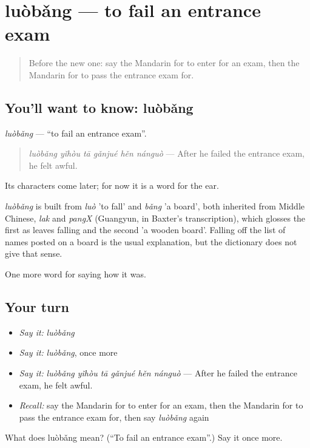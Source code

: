 \section[luòbǎng]{luòbǎng — to fail an entrance exam}

\label{lesson:ZH-C494-luobang}



\begin{quote}
Before the new one: say the Mandarin for to enter for an exam, then the Mandarin for to pass the entrance exam for.
\end{quote}

\subsection*{You'll want to know: luòbǎng}
\emph{luòbǎng} — \textquotedblleft{}to fail an entrance exam\textquotedblright{}.

\begin{quote}
\emph{luòbǎng yǐhòu tā gǎnjué hěn nánguò} — After he failed the entrance exam, he felt awful.
\end{quote}

Its characters come later; for now it is a word for the ear.

\begin{cousinweb}
\emph{luòbǎng} is built from \emph{luò} 'to fall' and \emph{bǎng} 'a board', both inherited from Middle Chinese, \emph{lak} and \emph{pangX} (Guangyun, in Baxter's transcription), which glosses the first as leaves falling and the second 'a wooden board'. Falling off the list of names posted on a board is the usual explanation, but the dictionary does not give that sense.
\end{cousinweb}

\begin{grammarlens}[title={What you've built}]
One more word for saying how it was.
\end{grammarlens}

\subsection*{Your turn}
\begin{itemize}
\raggedright
  \item \emph{Say it:} \emph{luòbǎng}
  \item \emph{Say it:} \emph{luòbǎng}, once more
  \item \emph{Say it:} \emph{luòbǎng yǐhòu tā gǎnjué hěn nánguò} — After he failed the entrance exam, he felt awful.
  \item \emph{Recall:} say the Mandarin for to enter for an exam, then the Mandarin for to pass the entrance exam for, then say \emph{luòbǎng} again
\end{itemize}

\begin{tcolorbox}[breakable,colback=teal!4,colframe=teal!35!black,title={Before you move on}]
What does luòbǎng mean? (\textquotedblleft{}To fail an entrance exam\textquotedblright{}.) Say it once more.
\end{tcolorbox}
